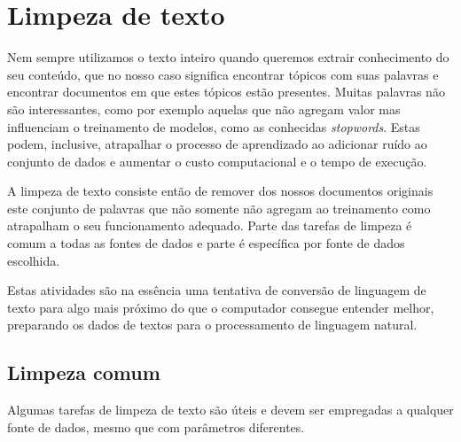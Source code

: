 \section{Limpeza de texto}

Nem sempre utilizamos o texto inteiro quando queremos extrair conhecimento do seu conteúdo, que no nosso caso significa encontrar tópicos com suas palavras e 
encontrar documentos em que estes tópicos estão presentes. Muitas palavras não são interessantes, como por exemplo aquelas que não agregam valor 
mas influenciam o treinamento de modelos, como as conhecidas \textit{stopwords}. Estas podem, inclusive, atrapalhar o processo de aprendizado 
ao adicionar ruído ao conjunto de dados e aumentar o custo computacional e o tempo de execução.

A limpeza de texto consiste então de remover dos nossos documentos originais este conjunto de palavras que não somente não agregam ao treinamento como atrapalham 
o seu funcionamento adequado. Parte das tarefas de limpeza é comum a todas as fontes de dados e parte é específica por fonte de dados escolhida.

Estas atividades são na essência uma tentativa de conversão de linguagem de texto para algo mais próximo do que o computador consegue entender melhor,
preparando os dados de textos para o processamento de linguagem natural.

\subsection{Limpeza comum}

Algumas tarefas de limpeza de texto são úteis e devem ser empregadas a qualquer fonte de dados, mesmo que com parâmetros diferentes.

